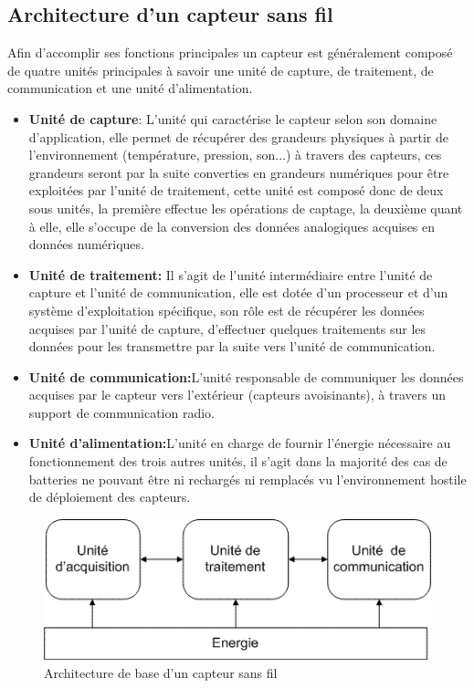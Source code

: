 	\subsection{Architecture d'un capteur sans fil}
	Afin d'accomplir ses fonctions principales un capteur est généralement composé de quatre unités principales à savoir une unité de capture, de traitement, de communication et une unité d'alimentation.
	\begin{itemize}
		\item \textbf{Unité de capture}: L'unité qui caractérise le capteur selon son domaine d'application, elle permet de récupérer des grandeurs physiques à partir de l'environnement (température, pression, son...) à travers des capteurs, ces grandeurs seront par la suite converties en grandeurs numériques pour être exploitées par l'unité de traitement, cette unité est composé donc de deux sous unités, la première effectue les opérations de captage, la deuxième quant à elle, elle s'occupe de la conversion des données analogiques acquises en données numériques. \\

		
		\item \textbf{Unité de traitement:} Il s'agit de l'unité intermédiaire entre l'unité de capture et l'unité de communication, elle est dotée d'un processeur et d'un système d'exploitation spécifique, son rôle est de récupérer les données acquises par l'unité de capture, d'effectuer quelques traitements sur les données pour les transmettre par la suite vers l'unité de communication. \\
		
		
		\item \textbf{Unité de communication:}L'unité responsable de communiquer les données acquises par le capteur vers l'extérieur (capteurs avoisinants), à travers un support de communication radio. \\ 

		
		\item \textbf{Unité d'alimentation:}L'unité en charge de fournir l'énergie nécessaire au fonctionnement des trois autres unités, il s'agit dans la majorité des cas de batteries ne pouvant être ni rechargés ni remplacés vu l'environnement hostile de déploiement des capteurs.
	\end{itemize}
	
	
	
	
	\begin{figure}[h]
		\begin{center}
			\includegraphics[scale=0.7]{Chapitre1/architecture_capteur.png}
		\end{center}
		\caption{Architecture de base d'un capteur sans fil}
	\end{figure}
	
